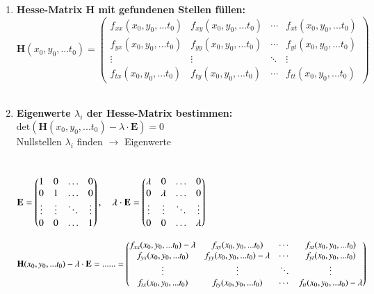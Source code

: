 \begin{enumerate}
    \item \textbf{Hesse-Matrix H mit gefundenen Stellen füllen:}\\
    $\mathbf{H}(x_0,y_0,...t_0)=
    \begin{pmatrix}
        f_{xx}(x_0,y_0,...t_0)&f_{xy}(x_0,y_0, ...t_0)&\cdots &f_{xt}(x_0,y_0,...t_0)\\
        f_{yx}(x_0,y_0,...t_0)&f_{yy}(x_0,y_0, ...t_0)&\cdots &f_{yt}(x_0,y_0,...t_0)\\
        \vdots &\vdots &\ddots &\vdots \\
        f_{tx}(x_0,y_0,...t_0)&f_{ty}(x_0,y_0, ...t_0)&\cdots &f_{tt}(x_0,y_0,...t_0)\end{pmatrix}$\\\\

    \item \textbf{Eigenwerte $\lambda_i$ der Hesse-Matrix bestimmen:}\\
    $\text{det}\left(\mathbf{H}(x_0,y_0,...t_0) - \lambda \cdot \mathbf{E}\right)  = 0$\\
    Nullstellen $\lambda_i$ finden $\rightarrow  $ Eigenwerte\\\\
    \\
    $\mathbf{E} = \begin{pmatrix}
        1&0&\ldots &0\\
        0&1&\ldots&0\\
        \vdots &\vdots &\ddots &\vdots \\
        0&0&\ldots&1\\
    \end{pmatrix}
    , \, \, \, \, \, \,
    \lambda \cdot \mathbf{E} = \begin{pmatrix}
        \lambda&0&\ldots &0\\
        0&\lambda&\ldots&0\\
        \vdots &\vdots &\ddots &\vdots \\
        0&0&\ldots&\lambda\\
    \end{pmatrix}
    \\$

    $\mathbf{H}(x_0,y_0,...t_0) - \lambda \cdot \mathbf{E} = ...\\
    ... = 
    \begin{pmatrix}
        f_{xx}(x_0,y_0,...t_0)- \lambda&f_{xy}(x_0,y_0, ...t_0)&\cdots &f_{xt}(x_0,y_0,...t_0)\\
        f_{yx}(x_0,y_0,...t_0)&f_{yy}(x_0,y_0, ...t_0)- \lambda&\cdots &f_{yt}(x_0,y_0,...t_0)\\
        \vdots &\vdots &\ddots &\vdots \\
        f_{tx}(x_0,y_0,...t_0)&f_{ty}(x_0,y_0, ...t_0)&\cdots &f_{tt}(x_0,y_0,...t_0)- \lambda\end{pmatrix}$\\    



\end{enumerate}
